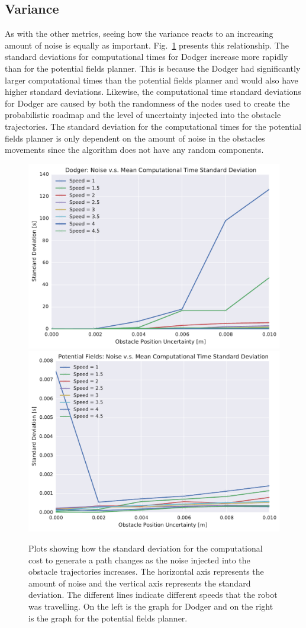 \subsection{Variance}

As with the other metrics, seeing how the variance reacts to an increasing
amount of noise is equally as important. Fig.~\ref{fig:plot_std_comp_time}
presents this relationship. The standard deviations for computational times for
Dodger increase more rapidly than for the potential fields planner. This is
because the Dodger had significantly larger computational times than the
potential fields planner and would also have higher standard deviations.
Likewise, the computational time standard deviations for Dodger are caused by
both the randomness of the nodes used to create the probabilistic roadmap and
the level of uncertainty injected into the obstacle trajectories. The standard
deviation for the computational times for the potential fields planner is only
dependent on the amount of noise in the obstacles movements since the algorithm
does not have any random components.

\begin{figure}[h!]
    \centering
    \includegraphics[width=0.48\linewidth]{figs/planner_std_avg_times_0}
    \includegraphics[width=0.48\linewidth]{figs/pf_std_avg_times_0}

    \caption{Plots showing how the standard deviation for the computational
        cost to generate a path changes as the noise injected into the obstacle
        trajectories increases.  The horizontal axis represents the amount of
        noise and the vertical axis represents the standard deviation. The
    different lines indicate different speeds that the robot was travelling. On
the left is the graph for Dodger and on the right is the graph for the
potential fields planner.}

    \label{fig:plot_std_comp_time}
\end{figure}

